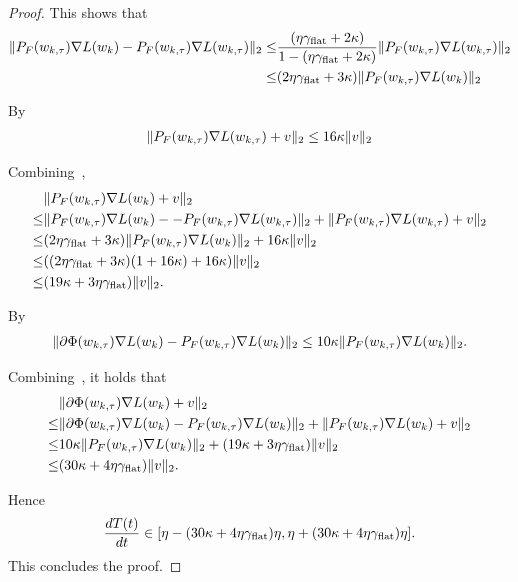 \begin{proof}
This shows that
\begin{align}
    \| {P}_F(w_{k, \tau}) \nabla L(w_k)  - {P}_F(w_{k, \tau}) \nabla L(w_{k, \tau}) \|_2 \le& \frac{(\eta \gamma_{\mathrm{flat}} + 2\kappa) }{1 - (\eta \gamma_{\mathrm{flat}} + 2\kappa)}  \|{P}_F (w_{k, \tau}) \nabla L(w_{k, \tau}) \|_2 \notag\\ \le&(2\eta \gamma_{\mathrm{flat}} + 3\kappa) \|{P}_F (w_{k, \tau}) \nabla L(w_k) \|_2 \label{eq:fpg2fpg}
\end{align}


By~
\begin{align}
\label{eq:fpg1river}
   \|  {P}_F(w_{k, \tau}) \nabla L(w_{k, \tau}) + v \|_2 \le 16 \kappa \| v \|_2 
\end{align}

Combining~,
\begin{align}
    &\| {P}_F(w_{k, \tau}) \nabla L(w_k) + v \|_2 \notag \\
    \le&  \| {P}_F(w_{k, \tau}) \nabla L(w_k) -  - {P}_F(w_{k, \tau}) \nabla L(w_{k, \tau})\|_2 +  \| {P}_F(w_{k, \tau}) \nabla L(w_{k,\tau}) + v \|_2 \notag \\
    \le& (2\eta \gamma_{\mathrm{flat}} + 3\kappa) \|{P}_F (w_{k, \tau}) \nabla L(w_k) \|_2 + 16\kappa \|v\|_2 \notag \\
    \le& ((2\eta \gamma_{\mathrm{flat}} + 3\kappa)( 1 + 16 \kappa) + 16\kappa)\|v\|_2 \notag  \\
    \le& ( 19\kappa + 3\eta\gamma_{\mathrm{flat}}) \| v\|_2. \label{eq:fpg2river}
\end{align}


By~
\begin{align}
\label{eq:phg1fpg}
     \| \partial \Phi(w_{k, \tau})  \nabla L(w_k) - {P}_F(w_{k, \tau}) \nabla L(w_k) \|_2 \le 10 \kappa \|{P}_F(w_{k, \tau}) \nabla L(w_k) \|_2.
\end{align}

Combining~, it holds that
\begin{align*}
&\| \partial \Phi(w_{k, \tau})  \nabla L(w_k)  + v\|_2 \\
\le& \| \partial \Phi(w_{k, \tau})  \nabla L(w_k) - {P}_F(w_{k, \tau}) \nabla L(w_k) \|_2 + \| {P}_F(w_{k, \tau}) \nabla L(w_k) + v \|_2 \\
\le& 10 \kappa \|{P}_F(w_{k, \tau}) \nabla L(w_k) \|_2 + ( 19 \kappa + 3\eta\gamma_{\mathrm{flat}}) \| v\|_2 \\
\le& (30 \kappa + 4\eta\gamma_{\mathrm{flat}}) \|v\|_2.
\end{align*}

Hence 
\begin{align*}
    \frac{d T(t)}{d t} \in [\eta - (30 \kappa + 4\eta\gamma_{\mathrm{flat}})\eta, \eta + (30 \kappa + 4\eta\gamma_{\mathrm{flat}})\eta].
\end{align*}
This concludes the proof.
\end{proof}


